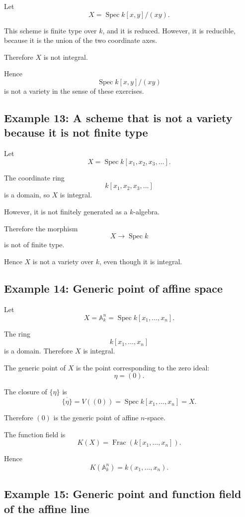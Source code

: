 \documentclass[12pt,a4paper]{article}
\theoremstyle{notespace}
\begin{document}
Let
\[
X=\operatorname{Spec} k[x,y]/(xy).
\]

This scheme is finite type over \(k\), and it is reduced. However, it is reducible, because it is the union of the two coordinate axes.

Therefore \(X\) is not integral.

Hence
\[
\operatorname{Spec} k[x,y]/(xy)
\]
is not a variety in the sense of these exercises.

\subsection{Example 13: A scheme that is not a variety because it is not finite type}

Let
\[
X=\operatorname{Spec} k[x_1,x_2,x_3,\dots].
\]

The coordinate ring
\[
k[x_1,x_2,x_3,\dots]
\]
is a domain, so \(X\) is integral.

However, it is not finitely generated as a \(k\)-algebra.

Therefore the morphism
\[
X\to \operatorname{Spec} k
\]
is not of finite type.

Hence \(X\) is not a variety over \(k\), even though it is integral.

\subsection{Example 14: Generic point of affine space}

Let
\[
X=\mathbb A_k^n=\operatorname{Spec} k[x_1,\dots,x_n].
\]

The ring
\[
k[x_1,\dots,x_n]
\]
is a domain. Therefore \(X\) is integral.

The generic point of \(X\) is the point corresponding to the zero ideal:
\[
\eta=(0).
\]

The closure of \(\{\eta\}\) is
\[
\overline{\{\eta\}}=V((0))=\operatorname{Spec} k[x_1,\dots,x_n]=X.
\]

Therefore \((0)\) is the generic point of affine \(n\)-space.

The function field is
\[
K(X)=\operatorname{Frac}(k[x_1,\dots,x_n]).
\]

Hence
\[
K(\mathbb A_k^n)=k(x_1,\dots,x_n).
\]

\subsection{Example 15: Generic point and function field of the affine line}
\end{document}
